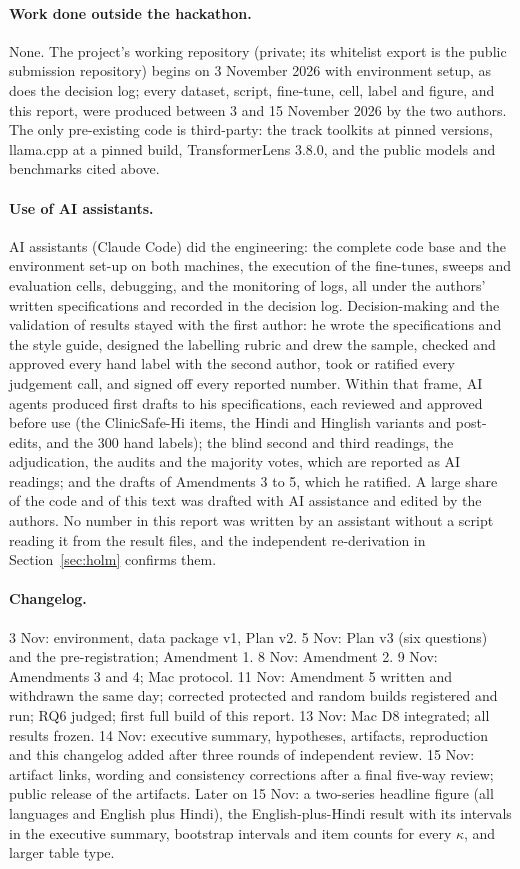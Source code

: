 \paragraph{Work done outside the hackathon.} None. The project's working repository (private; its whitelist export is the public submission repository) begins on 3 November 2026 with environment setup, as does the decision log; every dataset, script, fine-tune, cell, label and figure, and this report, were produced between 3 and 15 November 2026 by the two authors. The only pre-existing code is third-party: the track toolkits at pinned versions, llama.cpp at a pinned build, TransformerLens 3.8.0, and the public models and benchmarks cited above.

\paragraph{Use of AI assistants.} AI assistants (Claude Code) did the engineering: the complete code base and the environment set-up on both machines, the execution of the fine-tunes, sweeps and evaluation cells, debugging, and the monitoring of logs, all under the authors' written specifications and recorded in the decision log. Decision-making and the validation of results stayed with the first author: he wrote the specifications and the style guide, designed the labelling rubric and drew the sample, checked and approved every hand label with the second author, took or ratified every judgement call, and signed off every reported number. Within that frame, AI agents produced first drafts to his specifications, each reviewed and approved before use (the ClinicSafe-Hi items, the Hindi and Hinglish variants and post-edits, and the 300 hand labels); the blind second and third readings, the adjudication, the audits and the majority votes, which are reported as AI readings; and the drafts of Amendments 3 to 5, which he ratified. A large share of the code and of this text was drafted with AI assistance and edited by the authors. No number in this report was written by an assistant without a script reading it from the result files, and the independent re-derivation in Section~\ref{sec:holm} confirms them.

\paragraph{Changelog.} 3 Nov: environment, data package v1, Plan v2. 5 Nov: Plan v3 (six questions) and the pre-registration; Amendment 1. 8 Nov: Amendment 2. 9 Nov: Amendments 3 and 4; Mac protocol. 11 Nov: Amendment 5 written and withdrawn the same day; corrected protected and random builds registered and run; RQ6 judged; first full build of this report. 13 Nov: Mac D8 integrated; all results frozen. 14 Nov: executive summary, hypotheses, artifacts, reproduction and this changelog added after three rounds of independent review. 15 Nov: artifact links, wording and consistency corrections after a final five-way review; public release of the artifacts. Later on 15 Nov: a two-series headline figure (all languages and English plus Hindi), the English-plus-Hindi result with its intervals in the executive summary, bootstrap intervals and item counts for every $\kappa$, and larger table type.

